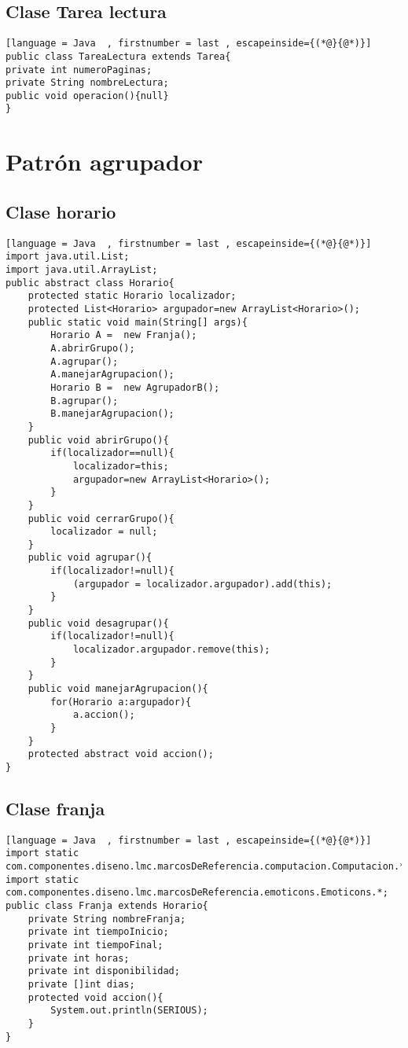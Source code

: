\subsection{Clase Tarea lectura}
\begin{lstlisting}[language = Java  , firstnumber = last , escapeinside={(*@}{@*)}]
public class TareaLectura extends Tarea{
private int numeroPaginas;
private String nombreLectura;
public void operacion(){null}
}
\end{lstlisting}

\section{Patrón agrupador}

\subsection{Clase horario}

\begin{lstlisting}[language = Java  , firstnumber = last , escapeinside={(*@}{@*)}]
import java.util.List;
import java.util.ArrayList;
public abstract class Horario{
	protected static Horario localizador;
	protected List<Horario> argupador=new ArrayList<Horario>();
	public static void main(String[] args){
		Horario A =  new Franja();
		A.abrirGrupo();
		A.agrupar();
		A.manejarAgrupacion();
		Horario B =  new AgrupadorB();
		B.agrupar();
		B.manejarAgrupacion();
	}
	public void abrirGrupo(){
		if(localizador==null){
   			localizador=this;
   			argupador=new ArrayList<Horario>();
   		}
	}
	public void cerrarGrupo(){
		localizador = null;
	}
	public void agrupar(){
		if(localizador!=null){
   			(argupador = localizador.argupador).add(this);
		}
	}
	public void desagrupar(){
		if(localizador!=null){
   			localizador.argupador.remove(this);
		}
	}
	public void manejarAgrupacion(){
		for(Horario a:argupador){
 	    	a.accion();
		}
	}
	protected abstract void accion();
}
\end{lstlisting}

\subsection{Clase franja}

\begin{lstlisting}[language = Java  , firstnumber = last , escapeinside={(*@}{@*)}]
import static com.componentes.diseno.lmc.marcosDeReferencia.computacion.Computacion.*;
import static com.componentes.diseno.lmc.marcosDeReferencia.emoticons.Emoticons.*;
public class Franja extends Horario{
	private String nombreFranja;
	private int tiempoInicio;
	private int tiempoFinal;
	private int horas;
	private int disponibilidad;
	private []int dias;
	protected void accion(){
		System.out.println(SERIOUS);
	}
}
\end{lstlisting}
